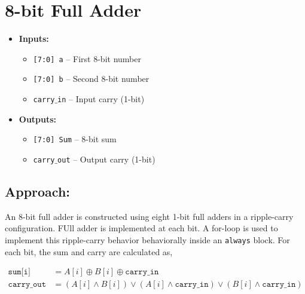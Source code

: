 \documentclass{article}
\begin{document}
\section{8-bit Full Adder}
\begin{itemize}
    \item \textbf{Inputs:}
    \begin{itemize}
        \item \texttt{[7:0] a} – First 8-bit number
        \item \texttt{[7:0] b} – Second 8-bit number 
        \item \texttt{carry$\_$in} – Input carry (1-bit)
    \end{itemize}
    \item \textbf{Outputs:}
    \begin{itemize}
        \item \texttt{[7:0] Sum} – 8-bit sum 
        \item \texttt{carry$\_$out} – Output carry (1-bit)
    \end{itemize}
\end{itemize}

\subsection*{Approach:}
An 8-bit full adder is constructed using eight 1-bit full adders in a ripple-carry configuration. FUll adder is implemented at each bit. A for-loop is used to implement this ripple-carry behavior behaviorally inside an \texttt{always} block. For each bit, the sum and carry are calculated as,

\begin{align*}
\texttt{sum[i]} &= A[i] \oplus B[i] \oplus \texttt{carry\_in}\\
\texttt{carry\_out} &= (A[i] \land B[i]) \lor (A[i] \land \texttt{carry\_in}) \lor (B[i] \land \texttt{carry\_in})
\end{align*}
\end{document}

